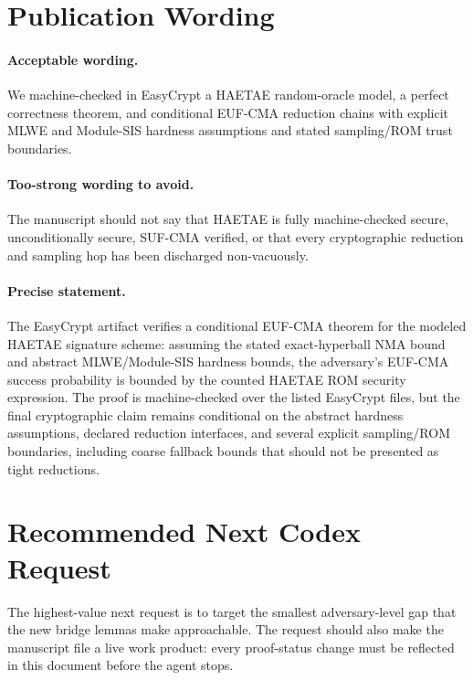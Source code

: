 \documentclass[11pt]{article}
\begin{document}
\section{Publication Wording}

\paragraph{Acceptable wording.}
We machine-checked in EasyCrypt a HAETAE random-oracle model, a perfect
correctness theorem, and conditional EUF-CMA reduction chains with explicit
MLWE and Module-SIS hardness assumptions and stated sampling/ROM trust
boundaries.

\paragraph{Too-strong wording to avoid.}
The manuscript should not say that HAETAE is fully machine-checked secure,
unconditionally secure, SUF-CMA verified, or that every cryptographic
reduction and sampling hop has been discharged non-vacuously.

\paragraph{Precise statement.}
The EasyCrypt artifact verifies a conditional EUF-CMA theorem for the
modeled HAETAE signature scheme: assuming the stated exact-hyperball NMA
bound and abstract MLWE/Module-SIS hardness bounds, the adversary's
EUF-CMA success probability is bounded by the counted HAETAE ROM security
expression.  The proof is machine-checked over the listed EasyCrypt files,
but the final cryptographic claim remains conditional on the abstract
hardness assumptions, declared reduction interfaces, and several explicit
sampling/ROM boundaries, including coarse fallback bounds that should not
be presented as tight reductions.

\section{Recommended Next Codex Request}

The highest-value next request is to target the smallest adversary-level
gap that the new bridge lemmas make approachable.  The request should also
make the manuscript file a live work product: every proof-status change must
be reflected in this document before the agent stops.
\end{document}
